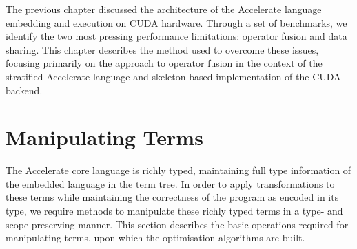 % 
% 
% 

The previous chapter discussed the architecture of the Accelerate language
embedding and execution on CUDA hardware. Through a set of benchmarks, we
identify the two most pressing performance limitations: operator fusion and data
sharing. This chapter describes the method used to overcome these issues,
focusing primarily on the approach to operator fusion in the context of the
stratified Accelerate language and skeleton-based implementation of the CUDA
backend.


\section{Manipulating Terms}
\label{sec:manipulating_terms}

The Accelerate core language is richly typed, maintaining full type information
of the embedded language in the term tree. In order to apply transformations to
these terms while maintaining the correctness of the program as encoded in its
type, we require methods to manipulate these richly typed terms in a type- and
scope-preserving manner. This section describes the basic operations required
for manipulating terms, upon which the optimisation algorithms are built.

